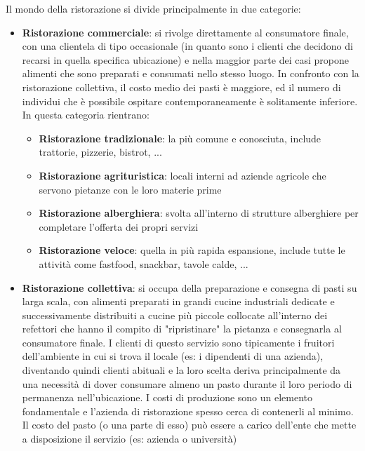 \documentclass[a4paper, titlepage, 12pt, openright, twoside]{book}
\begin{document}
Il mondo della ristorazione si divide principalmente in due categorie:
\begin{itemize}
	\item \textbf{Ristorazione commerciale}: si rivolge direttamente al consumatore finale, con una clientela di tipo occasionale
											 (in quanto sono i clienti che decidono di recarsi in quella specifica ubicazione) e nella maggior parte dei casi
											 propone alimenti che sono preparati e consumati nello stesso luogo. In confronto con la ristorazione collettiva,
											 il costo medio dei pasti è maggiore, ed il numero di individui che è possibile ospitare contemporaneamente è solitamente inferiore.
											 In questa categoria rientrano:
											 \begin{itemize}
											 	\item \textbf{Ristorazione tradizionale}: la più comune e conosciuta, include trattorie, pizzerie, bistrot, ...
											 	\item \textbf{Ristorazione agrituristica}: locali interni ad aziende agricole che servono pietanze con le loro materie prime
											 	\item \textbf{Ristorazione alberghiera}: svolta all'interno di strutture alberghiere per completare l'offerta dei propri servizi
											 	\item \textbf{Ristorazione veloce}: quella in più rapida espansione, include tutte le attività 
											 										come fastfood, snackbar, tavole calde, ...
											 \end{itemize}
	\item \textbf{Ristorazione collettiva}: si occupa della preparazione e consegna di pasti su larga scala, con alimenti preparati in grandi cucine industriali dedicate e
											successivamente distribuiti a cucine più piccole collocate all'interno dei refettori che hanno il compito di "ripristinare" la pietanza
											e consegnarla al consumatore finale. I clienti di questo servizio sono tipicamente i fruitori dell'ambiente in cui si trova il locale
											(es: i dipendenti di una azienda), diventando quindi clienti abituali e la loro scelta deriva principalmente 
											da una necessità di dover consumare almeno un pasto durante il loro periodo di permanenza nell'ubicazione. 
											I costi di produzione sono un elemento fondamentale e l'azienda di ristorazione spesso cerca di contenerli al minimo.
											Il costo del pasto (o una parte di esso) può essere a carico dell'ente che mette a disposizione il servizio (es: azienda o università)

\end{itemize}
\end{document}
